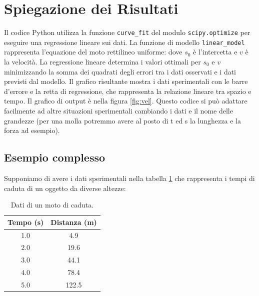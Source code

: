 \documentclass[a4paper,12pt]{article}
\begin{document}
\section{Spiegazione dei Risultati}
Il codice Python utilizza la funzione \texttt{curve\_fit} del modulo \texttt{scipy.optimize} per eseguire una regressione lineare sui dati. La funzione di modello \texttt{linear\_model} rappresenta l'equazione del moto rettilineo uniforme:
dove \( s_0 \) è l'intercetta e \( v \) è la velocità. La regressione lineare determina i valori ottimali per \( s_0 \) e \( v \) minimizzando la somma dei quadrati degli errori tra i dati osservati e i dati previsti dal modello.
Il grafico risultante mostra i dati sperimentali con le barre d'errore e la retta di regressione, che rappresenta la relazione lineare tra spazio e tempo. 
Il grafico di output è nella figura \ref{fig:vel}. Questo codice si può adattare facilmente ad altre situazioni sperimentali cambiando i dati e il nome delle grandezze (per una molla potremmo avere al posto di t ed s la lunghezza e la forza ad esempio). 




\subsection{Esempio complesso}
Supponiamo di avere i dati sperimentali nella tabella \ref{tab:regrcompl} che rappresenta i tempi di caduta di un oggetto da diverse altezze:
\begin{table}[h!]
\centering
\begin{tabular}{|c|c|}
\hline
Tempo (s) & Distanza (m) \\
\hline
1.0 & 4.9 \\
2.0 & 19.6 \\
3.0 & 44.1 \\
4.0 & 78.4 \\
5.0 & 122.5 \\
\hline
\end{tabular}
\caption{Dati di un moto di caduta.}
\label{tab:regrcompl}
\end{table}
\end{document}
